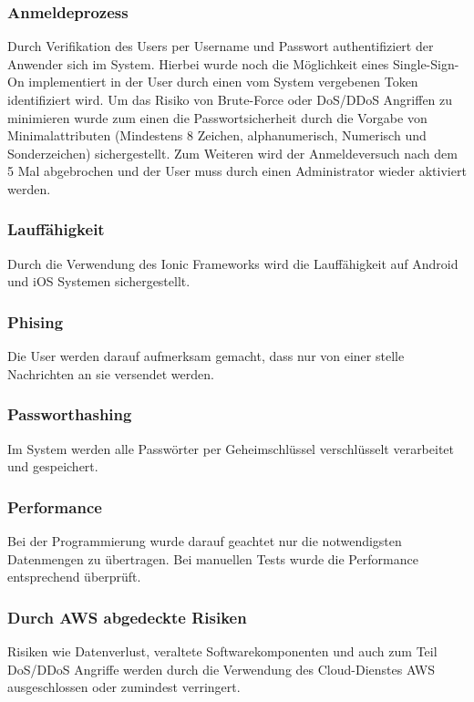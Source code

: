 \subsubsection{Anmeldeprozess}
Durch Verifikation des Users per Username und Passwort authentifiziert der Anwender sich im System. Hierbei wurde noch die Möglichkeit eines Single-Sign-On implementiert in der User durch einen vom System vergebenen Token identifiziert wird. Um das Risiko von Brute-Force oder DoS/DDoS Angriffen zu minimieren wurde zum einen die Passwortsicherheit durch die Vorgabe von Minimalattributen (Mindestens 8 Zeichen, alphanumerisch, Numerisch und Sonderzeichen) sichergestellt. Zum Weiteren wird der Anmeldeversuch nach dem 5 Mal abgebrochen und der User muss durch einen Administrator wieder aktiviert werden.
\subsubsection{Lauffähigkeit}
Durch die Verwendung des Ionic Frameworks wird die Lauffähigkeit auf Android und iOS Systemen sichergestellt.
\subsubsection{Phising}
Die User werden darauf aufmerksam gemacht, dass nur von einer stelle Nachrichten an sie versendet werden. 
\subsubsection{Passworthashing}
Im System werden alle Passwörter per Geheimschlüssel verschlüsselt verarbeitet und gespeichert.
\subsubsection{Performance}
Bei der Programmierung wurde darauf geachtet nur die notwendigsten Datenmengen zu übertragen. Bei manuellen Tests wurde die Performance entsprechend überprüft.
\subsubsection{Durch AWS abgedeckte Risiken}
Risiken wie Datenverlust, veraltete Softwarekomponenten und auch zum Teil DoS/DDoS Angriffe werden durch die Verwendung des Cloud-Dienstes AWS ausgeschlossen oder zumindest verringert.